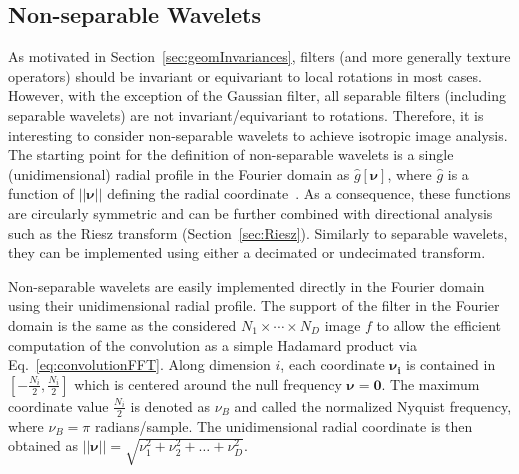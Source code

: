 \documentclass[fleqn,a4paper,oneside,openany]{book}
\begin{document}
\subsection{Non-separable Wavelets}\label{sec:nonseparableWavelets}
%
As motivated in  Section~\ref{sec:geomInvariances}, filters (and more generally texture operators) should be invariant or equivariant to local rotations in most cases. 
However, with the exception of the Gaussian filter, all separable filters (including separable wavelets) are not invariant/equivariant to rotations.
Therefore, it is interesting to consider non-separable wavelets to achieve isotropic image analysis.
The starting point for the definition of non-separable wavelets is a single (unidimensional) radial profile in the Fourier domain as $\hat{g}[\boldsymbol{\nu}]$, where $\hat{g}$ is a function of $||\boldsymbol{\nu}||$ defining the radial coordinate~\cite{UCV2011}.
As a consequence, these functions are circularly symmetric and can be further combined with directional analysis such as the Riesz transform (Section~\ref{sec:Riesz}).
Similarly to separable wavelets, they can be implemented using either a decimated or undecimated transform.

Non-separable wavelets are easily implemented directly in the Fourier domain using their unidimensional radial profile.
The support of the filter in the Fourier domain is the same as the considered $N_1\times\cdots\times N_D$ image $f$ to allow the efficient computation of the convolution as a simple Hadamard product via Eq.~\eqref{eq:convolutionFFT}.
Along dimension $i$, each coordinate $\boldsymbol{\nu_i}$ is contained in $[-\frac{N_i}{2},\frac{N_i}{2}]$ which is centered around the null frequency $\boldsymbol{\nu}=\boldsymbol{0}$.
The maximum coordinate value $\frac{N_i}{2}$ is denoted as $\nu_{B}$ and called the normalized Nyquist frequency, where $\nu_{B}=\pi$ radians/sample.
The unidimensional radial coordinate is then obtained as $||\boldsymbol{\nu}||=\sqrt{\nu_1^2+\nu_2^2+\dots+\nu_D^2}$.
\end{document}
